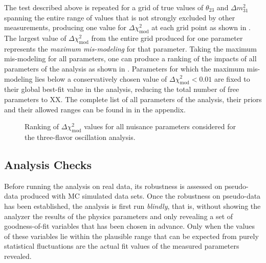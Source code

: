The test described above is repeated for a grid of true values of $\theta_{23}$ and $\Delta m^2_{31}$ spanning the entire range of values that is not strongly excluded by other measurements, producing one value for $\Delta \chi^2_{\mathrm{mod}}$ at each grid point as shown in . The largest value of $\Delta \chi^2_{\mathrm{mod}}$ from the entire grid produced for one parameter represents the \emph{maximum mis-modeling} for that parameter. Taking the maximum mis-modeling for all parameters, one can produce a ranking of the impacts of all parameters of the analysis as shown in . Parameters for which the maximum mis-modeling lies below a conservatively chosen value of $\Delta \chi^2_{\mathrm{mod}} < 0.01$ are fixed to their global best-fit value in the analysis, reducing the total number of free parameters to XX. The complete list of all parameters of the analysis, their priors and their allowed ranges can be found in  in the appendix.
\begin{figure}
    \centering
    \caption{Ranking of $\Delta \chi^2_{\mathrm{mod}}$ values for all nuisance parameters considered for the three-flavor oscillation analysis.}
    \label{fig:systematic-impact-mismod-ranking}
\end{figure}

\subsection{Analysis Checks}
Before running the analysis on real data, its robustness is assessed on pseudo-data produced with MC simulated data sets. Once the robustness on pseudo-data has been established, the analysis is first run \emph{blindly}, that is, without showing the analyzer the results of the physics parameters and only revealing a set of goodness-of-fit variables that has been chosen in advance. Only when the values of these variables lie within the plausible range that can be expected from purely statistical fluctuations are the actual fit values of the measured parameters revealed. 

